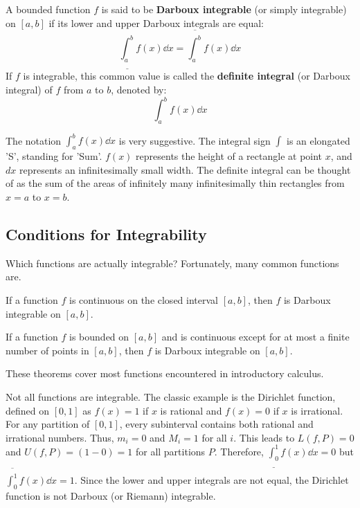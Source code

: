 \begin{definition}
A bounded function $f$ is said to be \textbf{Darboux integrable} (or simply integrable) on $[a, b]$ if its lower and upper Darboux integrals are equal:
\[ \underline{\int_a^b} f(x) \dd x = \overline{\int_a^b} f(x) \dd x \]
If $f$ is integrable, this common value is called the \textbf{definite integral} (or Darboux integral) of $f$ from $a$ to $b$, denoted by:
\[ \int_a^b f(x) \dd x \]
\end{definition}

\begin{remark}
The notation $\int_a^b f(x) \dd x$ is very suggestive. The integral sign $\int$ is an elongated 'S', standing for 'Sum'. $f(x)$ represents the height of a rectangle at point $x$, and $dx$ represents an infinitesimally small width. The definite integral can be thought of as the sum of the areas of infinitely many infinitesimally thin rectangles from $x=a$ to $x=b$.
\end{remark}

\subsection{Conditions for Integrability}

Which functions are actually integrable? Fortunately, many common functions are.

\begin{theorem}
If a function $f$ is continuous on the closed interval $[a, b]$, then $f$ is Darboux integrable on $[a, b]$.
\end{theorem}

\begin{theorem}
If a function $f$ is bounded on $[a, b]$ and is continuous except for at most a finite number of points in $[a, b]$, then $f$ is Darboux integrable on $[a, b]$.
\end{theorem}

These theorems cover most functions encountered in introductory calculus.

\begin{remark}
Not all functions are integrable. The classic example is the Dirichlet function, defined on $[0, 1]$ as $f(x) = 1$ if $x$ is rational and $f(x) = 0$ if $x$ is irrational. For any partition of $[0, 1]$, every subinterval contains both rational and irrational numbers. Thus, $m_i = 0$ and $M_i = 1$ for all $i$. This leads to $L(f, P) = 0$ and $U(f, P) = (1-0) = 1$ for all partitions $P$. Therefore, $\underline{\int_0^1} f(x) \dd x = 0$ but $\overline{\int_0^1} f(x) \dd x = 1$. Since the lower and upper integrals are not equal, the Dirichlet function is not Darboux (or Riemann) integrable.
\end{remark}

